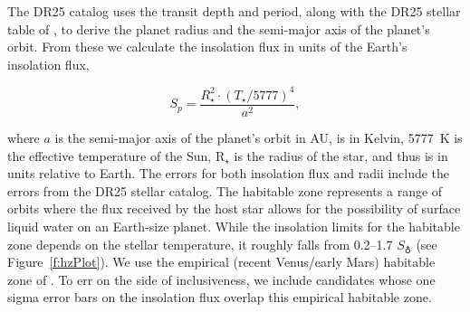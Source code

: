 The DR25 catalog uses the transit depth and period, along with the DR25 stellar table of \citet{Mathur2017ApJS}, to derive the planet radius and the semi-major axis of the planet's orbit.  From these we calculate the insolation flux in units of the Earth's insolation flux,

\begin{equation}
S_{p} = \frac{R_{\star}^{2} \cdot (T_{\star}/5777)^{4}}{a^{2}} ,
\end{equation}

\noindent where $a$ is the semi-major axis of the planet's orbit in AU, \tstar{} is in Kelvin, 5777~K is the effective temperature of the Sun, R$_{\star}$ is the radius of the star, and thus \Splanet{} is in units relative to Earth. The errors for both insolation flux and radii include the errors from the DR25 stellar catalog. The habitable zone represents a range of orbits where the flux received by the host star allows for the possibility of surface liquid water on an Earth-size planet.  While the insolation limits for the habitable zone depends on the stellar temperature, it roughly falls from 0.2--1.7 $S_{\earth}$ (see Figure~\ref{f:hzPlot}). We use the empirical (recent Venus/early Mars) habitable zone of \citet{Kopparapu2013}.  To err on the side of inclusiveness, we include candidates whose one sigma error bars on the insolation flux overlap this empirical habitable zone.





